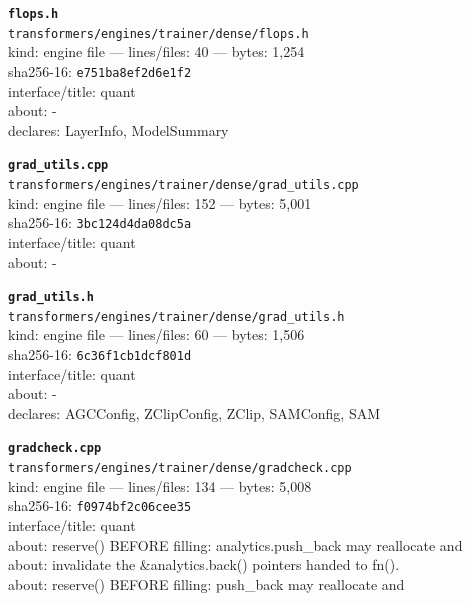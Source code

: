 \noindent\textbf{\texttt{flops.h}}\\
\texttt{transformers/engines/trainer/dense/flops.h}\\
kind: engine file --- lines/files: 40 --- bytes: 1,254\\
sha256-16: \texttt{e751ba8ef2d6e1f2}\\
interface/title: quant\\
about: -\\
declares: LayerInfo, ModelSummary\\
\vspace*{6.0pt}
\newpage

\noindent\textbf{\texttt{grad\_utils.cpp}}\\
\texttt{transformers/engines/trainer/dense/grad\_utils.cpp}\\
kind: engine file --- lines/files: 152 --- bytes: 5,001\\
sha256-16: \texttt{3bc124d4da08dc5a}\\
interface/title: quant\\
about: -\\
\vspace*{6.0pt}

\noindent\textbf{\texttt{grad\_utils.h}}\\
\texttt{transformers/engines/trainer/dense/grad\_utils.h}\\
kind: engine file --- lines/files: 60 --- bytes: 1,506\\
sha256-16: \texttt{6c36f1cb1dcf801d}\\
interface/title: quant\\
about: -\\
declares: AGCConfig, ZClipConfig, ZClip, SAMConfig, SAM\\
\vspace*{6.0pt}

\noindent\textbf{\texttt{gradcheck.cpp}}\\
\texttt{transformers/engines/trainer/dense/gradcheck.cpp}\\
kind: engine file --- lines/files: 134 --- bytes: 5,008\\
sha256-16: \texttt{f0974bf2c06cee35}\\
interface/title: quant\\
about: reserve() BEFORE filling: analytics.push\_back may reallocate and\\
about: invalidate the \&analytics.back() pointers handed to fn().\\
about: reserve() BEFORE filling: push\_back may reallocate and\\
\vspace*{6.0pt}

